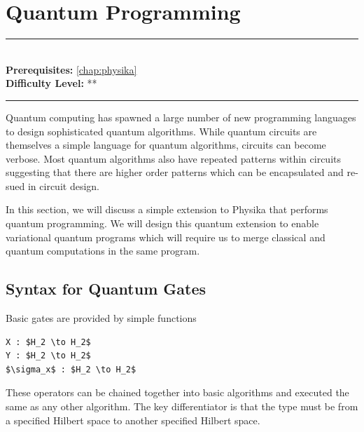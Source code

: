 \documentclass[book.tex]{subfiles}
\begin{document}
\chapter{Quantum Programming}

\label{chap:quantum_programmiing}
\noindent\rule{11cm}{0.4pt} \\
\textbf{Prerequisites:} \autoref{chap:physika} \\
\textbf{Difficulty Level:} ** \\
\noindent\rule{11cm}{0.4pt}
\vspace{5mm}


Quantum computing has spawned a large number of new programming languages to design sophisticated quantum algorithms. While quantum circuits are themselves a simple language for quantum algorithms, circuits can become verbose. Most quantum algorithms also have repeated patterns within circuits suggesting that there are higher order patterns which can be encapsulated and re-sued in circuit design.

In this section, we will discuss a simple extension to Physika that performs quantum programming. We will design this quantum extension to enable variational quantum programs which will require us to merge classical and quantum computations in the same program.

\section{Syntax for Quantum Gates}

Basic gates are provided by simple functions
\begin{lstlisting}
X : $H_2 \to H_2$
Y : $H_2 \to H_2$
$\sigma_x$ : $H_2 \to H_2$
\end{lstlisting}

These operators can be chained together into basic algorithms and executed the same as any other algorithm. The key differentiator is that the type must be from a specified Hilbert space to another specified Hilbert space.



\end{document}
